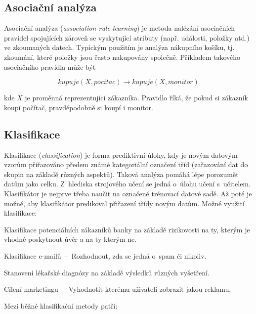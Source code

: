 \subsection{Asociační analýza}

Asociační analýza (\textit{association rule learning}) je metoda nalézání asociačních pravidel spojujících zároveň se vyskytující atributy (např. události, položky atd.) ve zkoumaných datech. Typickým použitím je analýza nákupního košíku, tj. zkoumání, které položky jsou často nakupovány společně. Příkladem takového asociačního pravidla může být

\begin{equation}
    kupuje(X, pocitac) \rightarrow kupuje(X, monitor)
\end{equation}

kde $X$ je proměnná reprezentující zákazníka. Pravidlo říká, že pokud si zákazník koupí počítač, pravděpodobně si koupí i monitor.

\subsection*{Klasifikace}

Klasifikace (\textit{classification}) je forma prediktivní úlohy, kdy je novým datovým vzorům přiřazováno předem známé kategoriální označení tříd (zařazování dat do skupin na základě různých aspektů). Taková analýza pomáhá lépe porozumět datům jako celku. Z~hlediska strojového učení se jedná o~úlohu učení s~učitelem. Klasifikátor je nejprve třeba naučit na označené trénovací datové sadě. Až poté je možné, aby klasifikátor predikoval přiřazení třídy novým datům. Možné využití klasifikace:

\begin{compactitem}
    \item Klasifikace potenciálních zákazníků banky na základě rizikovosti na ty, kterým je vhodné poskytnout úvěr a na ty kterým ne.

    \item Klasifikace e-mailů~--~Rozhodnout, zda se jedná o~spam či nikoliv.

    \item Stanovení lékařské diagnózy na základě výsledků různých vyšetření.

    \item Cílení marketingu~--~Vyhodnotit kterému uživateli zobrazit jakou reklamu.
\end{compactitem}

Mezi běžné klasifikační metody patří:


